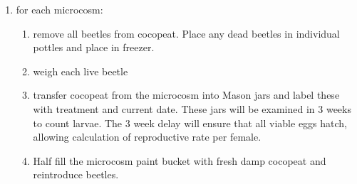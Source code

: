 \documentclass[twocolumn, 12pt,letterpaper,english,bibliography=totocnumbered, abstract=on]{scrartcl}
\begin{document}
\begin{enumerate}	
    \item for each microcosm:
    \begin{enumerate}
        \item remove all beetles from cocopeat. Place any dead beetles in individual pottles and place in freezer.
        \item weigh each live beetle
		\item transfer cocopeat from the microcosm into Mason jars and label these with treatment and current date. These jars will be examined in 3 weeks to count larvae. The 3 week delay will ensure that all viable eggs hatch, allowing calculation of reproductive rate per female.
		\item Half fill the microcosm paint bucket with fresh damp cocopeat and reintroduce beetles.
    \end{enumerate} 
\end{enumerate}

\pagebreak
\printbibliography
\end{document}
